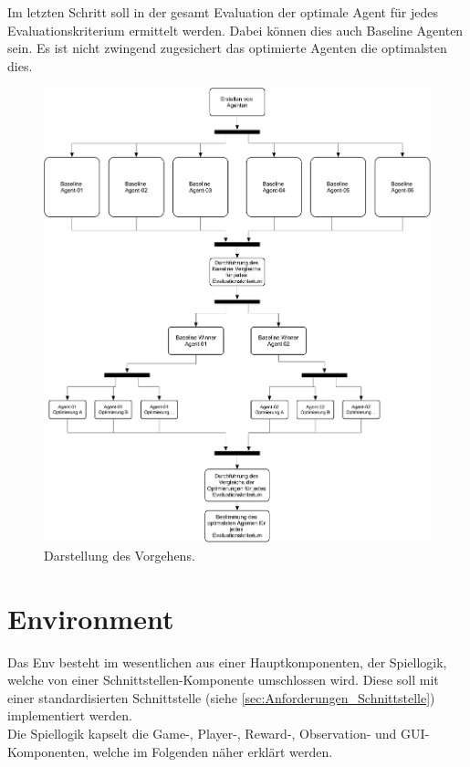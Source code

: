 Im letzten Schritt soll in der gesamt Evaluation der optimale Agent für jedes Evaluationskriterium ermittelt werden. Dabei können dies auch Baseline Agenten sein. Es ist nicht zwingend zugesichert das optimierte Agenten die optimalsten dies.
\begin{figure}[H]
	\centering
	\includegraphics[scale=0.095]{Abbildungen/Vorgehen.png}
	\caption[Flussdiagramm des Vorgehens]{Darstellung des Vorgehens.}
	\label{fig:Vorgehen}
\end{figure}

\section{Environment} \label{sec:Konzept_Environment}
Das Env besteht im wesentlichen aus einer Hauptkomponenten, der Spiellogik, welche von einer Schnittstellen-Komponente umschlossen wird. Diese soll mit einer standardisierten Schnittstelle (siehe \ref{sec:Anforderungen_Schnittstelle}) implementiert werden.\\
Die Spiellogik kapselt die Game-, Player-, Reward-, Observation- und GUI-Komponenten, welche im Folgenden näher erklärt werden.

